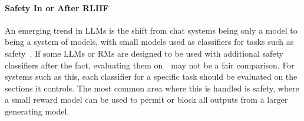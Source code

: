 \paragraph{Safety In or After RLHF}
An emerging trend in LLMs is the shift from chat systems being only a model to being a system of models, with small models used as classifiers for tasks such as safety~\citep{mozes2023agile}.
If some LLMs or RMs are designed to be used with additional safety classifiers after the fact, evaluating them on~\name~may not be a fair comparison.
For systems such as this, each classifier for a specific task should be evaluated on the sections it controls. 
The most common area where this is handled is safety, where a small reward model can be used to permit or block all outputs from a larger generating model.